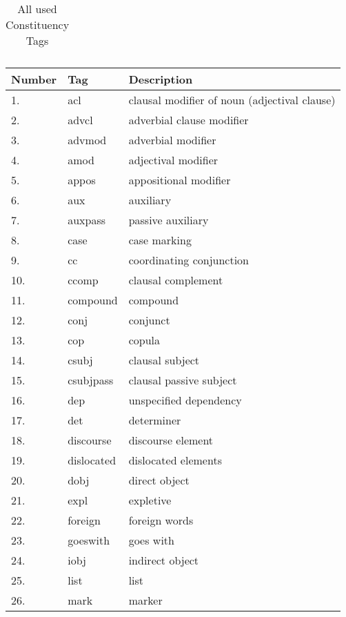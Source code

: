 \begin{table}[h]
\begin{tabular}{| l | l | l |}
    \end{tabular}
      \caption{All used Constituency Tags}
     \label{table:AllConstituencyTags}
\end{table}



\begin{table}[h]
	\centering
    \begin{tabular}{| l | l | l |}
    \hline
    Number & Tag & Description \\ \hline
	\hline
1. & 	acl  & clausal modifier of noun (adjectival clause) \\ \hline
2. &    advcl  & adverbial clause modifier\\ \hline
3. & 	advmod  & adverbial modifier \\ \hline
4. &    amod  & adjectival modifier \\ \hline
5. & 	appos  & appositional modifier \\ \hline
6. & 	aux  & auxiliary \\ \hline
7. &    auxpass  & passive auxiliary \\ \hline
8. & 	case  & case marking \\ \hline
9. & 	cc  & coordinating conjunction \\ \hline
10. &  ccomp  & clausal complement \\ \hline
11. &  compound  & compound \\ \hline
12. & 	conj  & conjunct \\ \hline
13. & 	cop  & copula \\ \hline
14. &  csubj  & clausal subject \\ \hline
15. &  csubjpass  & clausal passive subject \\ \hline
16. &  dep  & unspecified dependency \\ \hline
17. & det  & determiner \\ \hline
18. & discourse  & discourse element \\ \hline
19. &  dislocated  & dislocated elements \\ \hline
20. & 	dobj  & direct object \\ \hline
21. &  expl  & expletive \\ \hline
22. &  foreign  & foreign words \\ \hline
23. &  goeswith  & goes with \\ \hline
24. &  iobj  & indirect object \\ \hline
25. &  list  & list \\ \hline
26. &  mark  & marker \\ \hline

\end{tabular}
\end{table}

